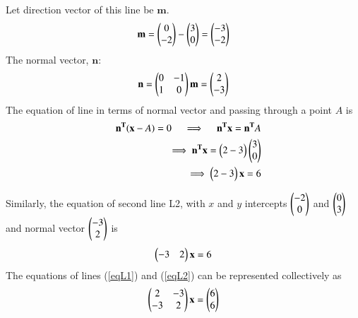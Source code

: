 \documentclass[journal,12pt,twocolumn]{IEEEtran}
\begin{document}
\noindent Let direction vector of this line be $\mathbf{m}$.
\begin{align}
	\mathbf{m} = \begin{pmatrix}0\\-2\end{pmatrix} - \begin{pmatrix}3\\0\end{pmatrix} = \begin{pmatrix}-3\\-2\end{pmatrix}
\end{align}
The normal vector, $\mathbf{n}$: 
\begin{align}
	{\mathbf{n}} = \begin{pmatrix}0 & -1 \\ 1 & 0\end{pmatrix}\mathbf{m} = \begin{pmatrix}2 \\ -3\end{pmatrix}
\end{align}
The equation of line in terms of normal vector and passing through a point $A$ 
	is
\begin{align}
	\quad \mathbf{n^T}(\mathbf{x} - A ) = 0
	\quad \implies \quad \mathbf{n^Tx} = \mathbf{n^T}A \\
	\implies \mathbf{n^Tx}= \begin{pmatrix}2 -3\end{pmatrix}\begin{pmatrix}3 \\ 0\end{pmatrix} \\
	\implies \begin{pmatrix}2 -3\end{pmatrix}\mathbf{x} = 6	\label{eqL1}
\end{align}

\noindent Similarly, the equation of second line L2, with $x$ and 
	$y$ intercepts $\begin{pmatrix} -2 \\ 0\end{pmatrix}$ and $\begin{pmatrix} 0 \\ 3\end{pmatrix}$ and 
	normal vector $\begin{pmatrix} -3 \\ 2\end{pmatrix}$ is
\begin{align}
	\begin{pmatrix}-3 &  2 \end{pmatrix} {\mathbf{x}} = 6	\label{eqL2}
\end{align}
The equations of lines (\ref{eqL1}) and (\ref{eqL2}) can be represented 
	collectively as
\begin{align}
	\begin{pmatrix}2 & -3 \\ -3 & 2\end{pmatrix}\mathbf{x} = \begin{pmatrix}6 \\ 6\end{pmatrix}
\end{align}
\end{document}
